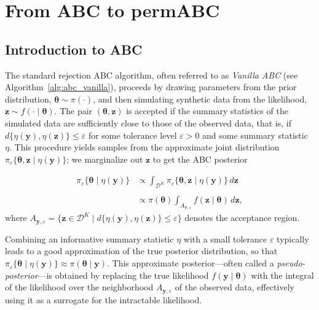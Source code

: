 \documentclass[11pt,a4paper]{article}
\def\Clust{K}
\def\dataspace{\mathcal{D}}
\def\obsdata{\mathbf{y}}
\def\param{\boldsymbol{\theta}}
\def\simdata{\mathbf{z}}
\theoremstyle{plain}
\theoremstyle{definition}
\theoremstyle{remark}
\begin{document}
\section{From ABC to permABC}
\label{secabc_to_permabc}

\subsection{Introduction to ABC}

The standard rejection ABC algorithm, often referred to as \emph{Vanilla ABC} (see Algorithm~\ref{alg:abc_vanilla}), proceeds by drawing parameters from the prior distribution, $\param \sim \pi(\cdot)$, and then simulating synthetic data from the likelihood, $\simdata \sim f(\cdot \mid \param)$. The pair $(\param, \simdata)$ is accepted if the summary statistics of the simulated data are sufficiently close to those of the observed data, that is, if $d\{\eta(\obsdata), \eta(\simdata)\} \leq \varepsilon$ for some tolerance level $\varepsilon > 0$ and some summary statistic $\eta$. This procedure yields samples from the approximate joint distribution $\pi_{\varepsilon}\{\param,\simdata \mid \eta(\obsdata)\}$; we marginalize out $\simdata$ to get the ABC posterior

\begin{equation}
    \label{eqabc}
    \begin{split}
        \pi_{\varepsilon}\{\param \mid \eta(\obsdata)\} &\propto
        \int_{\dataspace^\Clust} \pi_{\varepsilon}\{\param, \simdata \mid \eta(\obsdata)\} \, d\simdata \\\\
        &\propto \pi(\param) \int_{A_{\obsdata,\varepsilon}} f(\simdata \mid \param) \, d\simdata,
    \end{split}
\end{equation}
where $A_{\obsdata,\varepsilon} = \{\simdata \in \dataspace^\Clust \mid d\{\eta(\obsdata), \eta(\simdata)\} \leq \varepsilon\}$ denotes the acceptance region.

Combining an informative summary statistic $\eta$ with a small tolerance $\varepsilon$ typically leads to a good approximation of the true posterior distribution, so that $\pi_{\varepsilon}\{\param \mid \eta(\obsdata)\} \approx \pi(\param \mid \obsdata)$. This approximate posterior—often called a \emph{pseudo-posterior}—is obtained by replacing the true likelihood $f(\obsdata \mid \param)$ with the integral of the likelihood over the neighborhood $A_{\obsdata,\varepsilon}$ of the observed data, effectively using it as a surrogate for the intractable likelihood.
\end{document}
